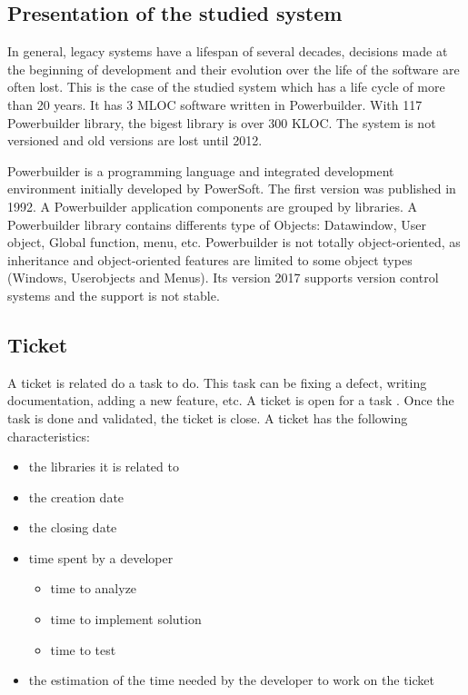 \documentclass[10pt,conference]{IEEEtran}
\begin{document}
\subsection{Presentation of the studied system}
In general, legacy systems have a lifespan of several decades, decisions made at the beginning of development and their evolution over the life of the software are often lost. 
This is the case of the studied system  which has a life cycle of  more than 20 years. 
It has 3 MLOC software written in Powerbuilder. With 117 Powerbuilder library, the  bigest library is  over 300 KLOC.
The system is not versioned and old versions are lost until 2012.

Powerbuilder is a programming language and integrated development environment initially developed by PowerSoft. The first version was published in 1992.
A Powerbuilder application components are grouped by libraries.  
A Powerbuilder library contains differents type of Objects: Datawindow, User object, Global function,  menu, etc. 
Powerbuilder is not totally object-oriented, as inheritance and object-oriented features are limited to some object types (Windows, Userobjects and Menus). 
Its version 2017 supports version control systems and the support is not stable. 
    

\subsection{Ticket}
A ticket is related do a task to do. 
This task can be fixing a defect, writing documentation, adding a new feature, etc. 
A ticket is open for a task . 
Once the task is done and validated, the ticket is close.
A ticket has the following characteristics:
\begin{itemize}
\item the libraries it  is related to
\item the creation date
\item the closing date
\item time spent by a developer
\begin{itemize}
\item time to analyze
\item time to implement solution
\item time to test
\end{itemize}
\item  the estimation of the time needed by the developer to work on the ticket
\end{itemize}
\end{document}
